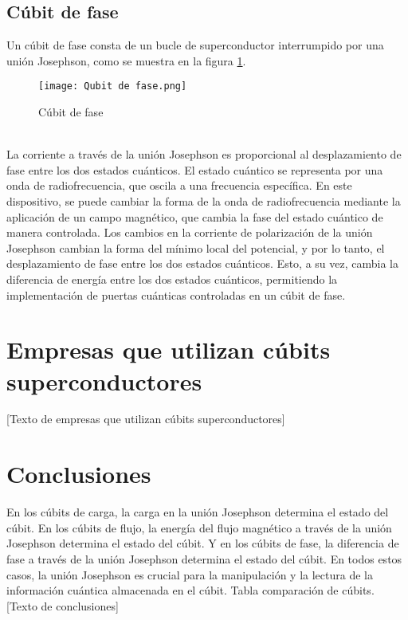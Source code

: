 \documentclass[12pt]{article}
\begin{document}
\subsection{Cúbit de fase}
Un cúbit de fase consta de un bucle de superconductor interrumpido por una unión Josephson, como se muestra en la figura \ref{fig:Cúbit de fase}. 
\begin{figure}[ht]
  \centering
  \texttt{[image: Qubit de fase.png]}
  \caption{Cúbit de fase \cite{gu_microwave_2017}}
  \label{fig:Cúbit de fase}
\end{figure} \\
La corriente a través de la unión Josephson es proporcional al desplazamiento de fase entre los dos estados cuánticos. El estado cuántico se representa por una onda de radiofrecuencia, que oscila a una frecuencia específica. En este dispositivo, se puede cambiar la forma de la onda de radiofrecuencia mediante la aplicación de un campo magnético, que cambia la fase del estado cuántico de manera controlada. Los cambios en la corriente de polarización de la unión Josephson cambian la forma del mínimo local del potencial, y por lo tanto, el desplazamiento de fase entre los dos estados cuánticos. Esto, a su vez, cambia la diferencia de energía entre los dos estados cuánticos, permitiendo la implementación de puertas cuánticas controladas en un cúbit de fase.
\\
\section{Empresas que utilizan cúbits superconductores}
[Texto de empresas que utilizan cúbits superconductores]
\section{Conclusiones}
En los cúbits de carga, la carga en la unión Josephson determina el estado del cúbit. En los cúbits de flujo, la energía del flujo magnético a través de la unión Josephson determina el estado del cúbit. Y en los cúbits de fase, la diferencia de fase a través de la unión Josephson determina el estado del cúbit. En todos estos casos, la unión Josephson es crucial para la manipulación y la lectura de la información cuántica almacenada en el cúbit.
Tabla comparación de cúbits.
[Texto de conclusiones]
\printbibliography
\end{document}

